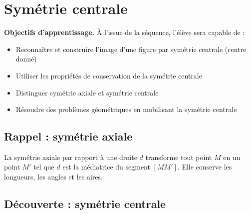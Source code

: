 \chapter{Sym\'etrie centrale}

\begin{objectifsbox}
\textbf{Objectifs d'apprentissage.} À l'issue de la séquence, l'élève sera capable de :
\begin{itemize}
  \item Reconnaître et construire l'image d'une figure par symétrie centrale (centre donné)
  \item Utiliser les propriétés de conservation de la symétrie centrale
  \item Distinguer symétrie axiale et symétrie centrale
  \item Résoudre des problèmes géométriques en mobilisant la symétrie centrale
\end{itemize}
\end{objectifsbox}

\section{Rappel : symétrie axiale}

\begin{proprietebox}
La sym\'etrie axiale par rapport à une droite $d$ transforme tout point $M$ en un point $M'$ tel que $d$ est la médiatrice du segment $[MM']$. Elle conserve les longueurs, les angles et les aires.
\end{proprietebox}

\begin{examplebox}[Illustration]
\begin{center}
\end{center}
\end{examplebox}

\section{Découverte : symétrie centrale}

